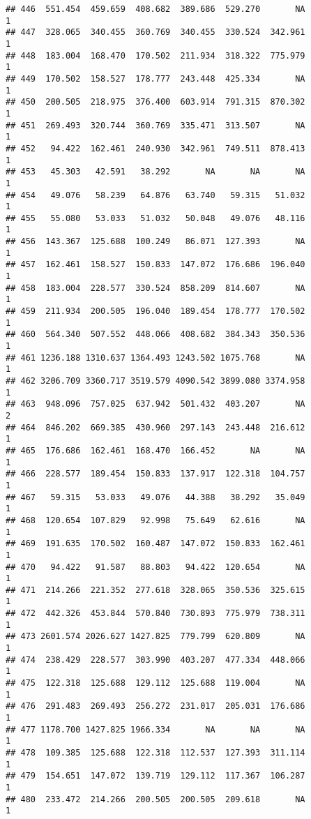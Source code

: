 \documentclass[
]{article}
\begin{document}
\begin{verbatim}
## 446  551.454  459.659  408.682  389.686  529.270       NA             1
## 447  328.065  340.455  360.769  340.455  330.524  342.961             1
## 448  183.004  168.470  170.502  211.934  318.322  775.979             1
## 449  170.502  158.527  178.777  243.448  425.334       NA             1
## 450  200.505  218.975  376.400  603.914  791.315  870.302             1
## 451  269.493  320.744  360.769  335.471  313.507       NA             1
## 452   94.422  162.461  240.930  342.961  749.511  878.413             1
## 453   45.303   42.591   38.292       NA       NA       NA             1
## 454   49.076   58.239   64.876   63.740   59.315   51.032             1
## 455   55.080   53.033   51.032   50.048   49.076   48.116             1
## 456  143.367  125.688  100.249   86.071  127.393       NA             1
## 457  162.461  158.527  150.833  147.072  176.686  196.040             1
## 458  183.004  228.577  330.524  858.209  814.607       NA             1
## 459  211.934  200.505  196.040  189.454  178.777  170.502             1
## 460  564.340  507.552  448.066  408.682  384.343  350.536             1
## 461 1236.188 1310.637 1364.493 1243.502 1075.768       NA             1
## 462 3206.709 3360.717 3519.579 4090.542 3899.080 3374.958             1
## 463  948.096  757.025  637.942  501.432  403.207       NA             2
## 464  846.202  669.385  430.960  297.143  243.448  216.612             1
## 465  176.686  162.461  168.470  166.452       NA       NA             1
## 466  228.577  189.454  150.833  137.917  122.318  104.757             1
## 467   59.315   53.033   49.076   44.388   38.292   35.049             1
## 468  120.654  107.829   92.998   75.649   62.616       NA             1
## 469  191.635  170.502  160.487  147.072  150.833  162.461             1
## 470   94.422   91.587   88.803   94.422  120.654       NA             1
## 471  214.266  221.352  277.618  328.065  350.536  325.615             1
## 472  442.326  453.844  570.840  730.893  775.979  738.311             1
## 473 2601.574 2026.627 1427.825  779.799  620.809       NA             1
## 474  238.429  228.577  303.990  403.207  477.334  448.066             1
## 475  122.318  125.688  129.112  125.688  119.004       NA             1
## 476  291.483  269.493  256.272  231.017  205.031  176.686             1
## 477 1178.700 1427.825 1966.334       NA       NA       NA             1
## 478  109.385  125.688  122.318  112.537  127.393  311.114             1
## 479  154.651  147.072  139.719  129.112  117.367  106.287             1
## 480  233.472  214.266  200.505  200.505  209.618       NA             1

\end{verbatim}
\end{document}
